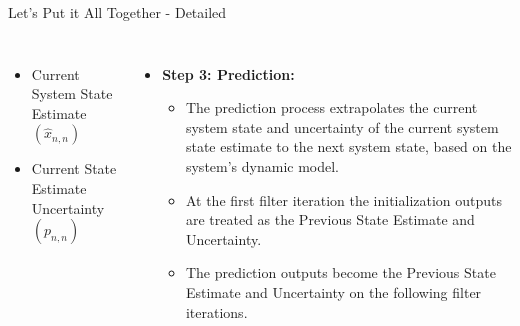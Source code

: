 \begin{frame}{Let's Put it All Together - Detailed}
\begin{columns}
	        \begin{itemize}
	            \item Current System State Estimate $(\hat{x}_{n,n})$
	            \item Current State Estimate Uncertainty $(p_{n,n})$
	        \end{itemize}
	    \begin{itemize} 
	        \item \textbf{Step 3: Prediction:}
	        \begin{itemize}
	            \item The prediction process extrapolates the current system state and uncertainty of the current system state estimate to the next system state, based on the system's dynamic model.
	            \item At the first filter iteration the initialization outputs are treated as the Previous State Estimate and Uncertainty.
	            \item The prediction outputs become the Previous State Estimate and Uncertainty on the following filter iterations.
	        \end{itemize}
	        
	            
	    \end{itemize}
\end{columns}	   	
\end{frame}


